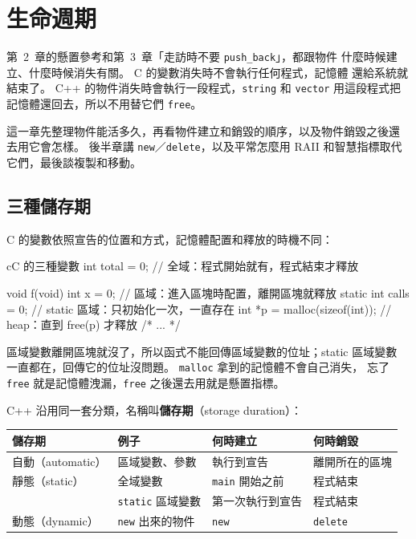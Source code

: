 \chapter{生命週期}
\label{ch:lifetime}

第~2~章的懸置參考和第~3~章「走訪時不要 \texttt{push\_back}」，都跟物件
什麼時候建立、什麼時候消失有關。 C 的變數消失時不會執行任何程式，記憶體
還給系統就結束了。 C++ 的物件消失時會執行一段程式，\texttt{string} 和
\texttt{vector} 用這段程式把記憶體還回去，所以不用替它們 \texttt{free}。

這一章先整理物件能活多久，再看物件建立和銷毀的順序，以及物件銷毀之後還
去用它會怎樣。 後半章講 \texttt{new}／\texttt{delete}，以及平常怎麼用
RAII 和智慧指標取代它們，最後談複製和移動。

\section{三種儲存期}
\label{sec:storage}

\begin{crecap}
C 的變數依照宣告的位置和方式，記憶體配置和釋放的時機不同：

\begin{code}{c}{C 的三種變數}
int total = 0;               // 全域：程式開始就有，程式結束才釋放

void f(void) {
    int x = 0;               // 區域：進入區塊時配置，離開區塊就釋放
    static int calls = 0;    // static 區域：只初始化一次，一直存在
    int *p = malloc(sizeof(int));   // heap：直到 free(p) 才釋放
    /* ... */
}
\end{code}

區域變數離開區塊就沒了，所以函式不能回傳區域變數的位址；static 區域變數
一直都在，回傳它的位址沒問題。 \texttt{malloc} 拿到的記憶體不會自己消失，
忘了 \texttt{free} 就是記憶體洩漏，\texttt{free} 之後還去用就是懸置指標。
\end{crecap}

C++ 沿用同一套分類，名稱叫\textbf{儲存期}（storage duration）：

\begin{center}
\begin{tabular}{llll}
\toprule
儲存期 & 例子 & 何時建立 & 何時銷毀 \\
\midrule
自動（automatic） & 區域變數、參數 & 執行到宣告 & 離開所在的區塊 \\
靜態（static） & 全域變數 & \texttt{main} 開始之前 & 程式結束 \\
 & \texttt{static} 區域變數 & 第一次執行到宣告 & 程式結束 \\
動態（dynamic） & \texttt{new} 出來的物件 & \texttt{new} & \texttt{delete} \\
\bottomrule
\end{tabular}
\end{center}

